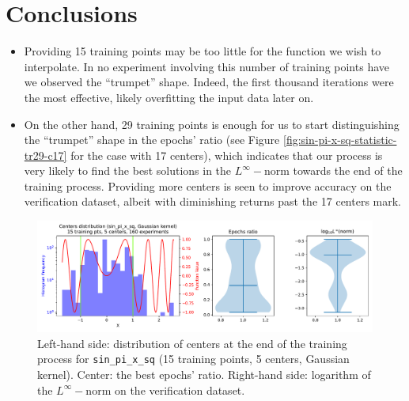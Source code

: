 \documentclass[12pt]{report} %
\begin{document}
\section*{Conclusions}

\begin{itemize}
  \item Providing 15 training points may be too little for the function
        we wish to interpolate. In no experiment
        involving this number of training points have we observed the ``trumpet'' shape.
        Indeed, the first thousand iterations were the most effective, likely overfitting
        the input data later on.
  \item On the other hand, 29 training points is enough for us to start distinguishing
        the ``trumpet'' shape in the epochs' ratio
        (see Figure \ref{fig:sin-pi-x-sq-statistic-tr29-c17}
        for the case with 17 centers), which indicates that our process is very likely
        to find the best solutions in the $L^\infty-$norm towards the end of the training process.
        Providing more centers is seen to improve accuracy on the verification dataset,
        albeit with diminishing returns past the 17 centers mark.
\end{itemize}

\begin{figure}[ht]
  \centering
  \includegraphics[width=\textwidth]
  {imagenes/experiments/1d/sin_pi_x_sq_statistic_interpolation/tr15_c5_sin_pi_x_sq_gaussian_kernel.pdf}
  \caption{Left-hand side: distribution of centers at the end of the training process for
    \texttt{sin\_pi\_x\_sq} (15 training points, 5 centers, Gaussian kernel). Center: the best epochs' ratio.
    Right-hand side: logarithm of the $L^\infty-$norm on the verification dataset.}
  \label{fig:sin-pi-x-sq-statistic-tr15-c5}
\end{figure}
\end{document}
